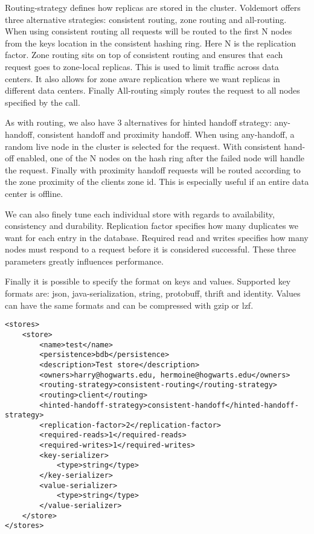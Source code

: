 \begin{itemize}
Routing-strategy defines how replicas are stored in the cluster. Voldemort offers three alternative strategies: consistent routing, zone routing and all-routing. When using consistent routing all requests will be routed to the first N nodes from the keys location in the consistent hashing ring. Here N is the replication factor. Zone routing sits on top of consistent routing and ensures that each request goes to zone-local replicas. This is used to limit traffic across data centers. It also allows for zone aware replication where we want replicas in different data centers. Finally All-routing simply routes the request to all nodes specified by the call. 

As with routing, we also have 3 alternatives for hinted handoff strategy: any-handoff, consistent handoff and proximity handoff. When using any-handoff, a random live node in the cluster is selected for the request. With consistent hand-off enabled, one of the N nodes on the hash ring after the failed node will handle the request. Finally with proximity handoff requests will be routed according to the zone proximity of the clients zone id. This is especially useful if an entire data center is offline. 

We can also finely tune each individual store with regards to availability, consistency and durability. Replication factor specifies how many duplicates we want for each entry in the database. Required read and writes specifies how many nodes must respond to a request before it is considered successful. These three parameters greatly influences performance. 

Finally it is possible to specify the format on keys and values. Supported key formats are: json, java-serialization, string, protobuff, thrift and identity. Values can have the same formats and can be compressed with gzip or lzf. 

\begin{lstlisting}[style=customc, caption=Sample stores.xml]
<stores>
    <store>
        <name>test</name>
        <persistence>bdb</persistence>
        <description>Test store</description>
        <owners>harry@hogwarts.edu, hermoine@hogwarts.edu</owners>
        <routing-strategy>consistent-routing</routing-strategy>
        <routing>client</routing>
        <hinted-handoff-strategy>consistent-handoff</hinted-handoff-strategy>
        <replication-factor>2</replication-factor>
        <required-reads>1</required-reads>
        <required-writes>1</required-writes>
        <key-serializer>
            <type>string</type>
        </key-serializer>
        <value-serializer>
            <type>string</type>
        </value-serializer>
    </store>
</stores>
\end{lstlisting}


\end{itemize}
